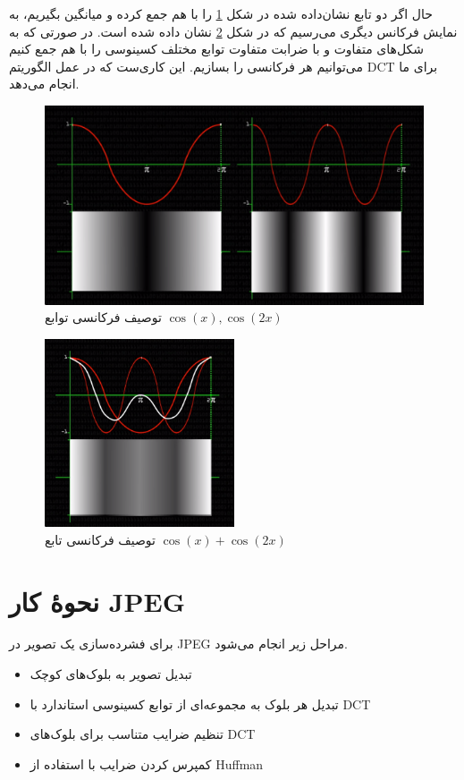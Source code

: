 حال اگر دو تابع نشان‌داده شده در 
شکل 
\ref{freq_1}
را با هم جمع کرده و میانگین بگیریم، به نمایش فرکانس دیگری می‌رسیم که در شکل 
\ref{freq_2}
نشان داده شده است.
در صورتی که به شکل‌های متفاوت و با ضرابت متفاوت توابع مختلف کسینوسی را با هم جمع کنیم می‌توانیم هر فرکانسی را بسازیم. این کاری‌ست که در 
عمل الگوریتم 
DCT برای ما انجام می‌دهد.
\begin{figure}[]
        \centering
        \includegraphics[width=\textwidth]{figs/freq_1.png}
        \caption{توصیف فرکانسی توابع 
        $\cos (x) , \cos (2x)$ }
        \label{freq_1}
\end{figure}

\begin{figure}[]
        \centering
        \includegraphics[width=0.5\textwidth]{figs/freq_2.png}
        \caption{توصیف فرکانسی تابع 
        $\cos (x) + \cos (2x)$}
        \label{freq_2}
\end{figure}

\section{نحوهٔ کار JPEG}
برای فشرده‌سازی یک تصویر در JPEG 
مراحل زیر انجام می‌شود. 

\begin{itemize}
        \item تبدیل تصویر به بلوک‌های کوچک 
        \item تبدیل هر بلوک به مجموعه‌ای از توابع کسینوسی استاندارد با DCT
        \item تنظیم ضرایب متناسب برای بلوک‌های DCT 
        \item کمپرس کردن ضرایب با استفاده از Huffman
\end{itemize}

